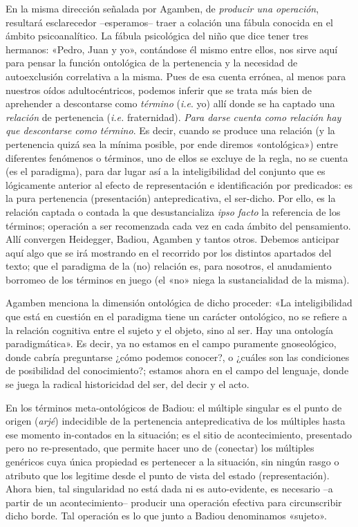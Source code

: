 En la misma dirección señalada por Agamben, de \emph{producir una operación}, resultará esclarecedor --esperamos-- traer a colación una fábula conocida en el ámbito psicoanalítico. La fábula psicológica del niño que dice tener tres hermanos: «Pedro, Juan y yo», contándose él mismo entre ellos, nos sirve aquí para pensar la función ontológica de la pertenencia y la necesidad de autoexclusión correlativa a la misma. Pues de esa cuenta errónea, al menos para nuestros oídos adultocéntricos, podemos inferir que se trata más bien de aprehender a descontarse como \emph{término} (\emph{i.e}. yo) allí donde se ha captado una \emph{relación }de pertenencia (\emph{i.e.} fraternidad). \emph{Para darse cuenta como relación hay que descontarse como término}. Es decir, cuando se produce una relación (y la pertenencia quizá sea la mínima posible, por ende diremos «ontológica») entre diferentes fenómenos o términos, uno de ellos se excluye de la regla, no se cuenta (es el paradigma), para dar lugar así a la inteligibilidad del conjunto que es lógicamente anterior al efecto de representación e identificación por predicados: es la pura pertenencia (presentación) antepredicativa, el ser-dicho. Por ello, es la relación captada o contada la que desustancializa \emph{ipso facto} la referencia de los términos; operación a ser recomenzada cada vez en cada ámbito del pensamiento. Allí convergen Heidegger, Badiou, Agamben y tantos otros. Debemos anticipar aquí algo que se irá mostrando en el recorrido por los distintos apartados del texto; que el paradigma de la (no) relación es, para nosotros, el anudamiento borromeo de los términos en juego (el «no» niega la sustancialidad de la misma).

Agamben menciona la dimensión ontológica de dicho proceder: «La inteligibilidad que está en cuestión en el paradigma tiene un carácter ontológico, no se refiere a la relación cognitiva entre el sujeto y el objeto, sino al ser. Hay una ontología paradigmática». Es decir, ya no estamos en el campo puramente gnoseológico, donde cabría preguntarse ¿cómo podemos conocer?, o ¿cuáles son las condiciones de posibilidad del conocimiento?; estamos ahora en el campo del lenguaje, donde se juega la radical historicidad del ser, del decir y el acto.

En los términos meta-ontológicos de Badiou: el múltiple singular es el punto de origen (\emph{arjé}) indecidible de la pertenencia antepredicativa de los múltiples hasta ese momento in-contados en la situación; es el sitio de acontecimiento, presentado pero no re-presentado, que permite hacer uno de (conectar) los múltiples genéricos cuya única propiedad es pertenecer a la situación, sin ningún rasgo o atributo que los legitime desde el punto de vista del estado (representación). Ahora bien, tal singularidad no está dada ni es auto-evidente, es necesario --a partir de un acontecimiento-- producir una operación efectiva para circunscribir dicho borde. Tal operación es lo que junto a Badiou denominamos «sujeto».


